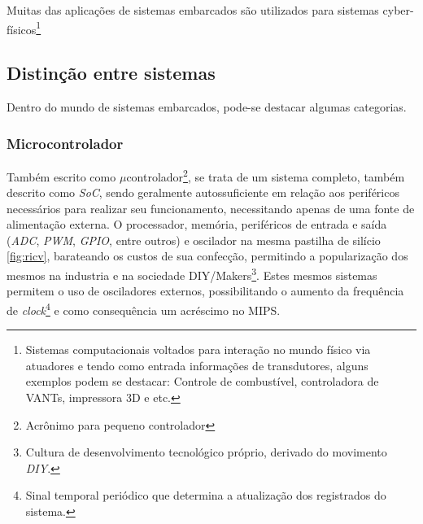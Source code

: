 Muitas das aplicações de sistemas embarcados são utilizados para sistemas cyber-físicos\footnote{Sistemas computacionais
voltados para interação no mundo físico via atuadores e tendo como entrada informações de transdutores, alguns exemplos
podem se destacar: Controle de combustível, controladora de VANTs, impressora 3D e etc.}

\subsection{Distinção entre sistemas}
Dentro do mundo de sistemas embarcados, pode-se destacar algumas categorias.

\subsubsection{Microcontrolador}

Também escrito como $\mu$controlador\footnote{Acrônimo para pequeno controlador}, se trata de um sistema completo,
também descrito como \textit{SoC}, sendo geralmente autossuficiente em relação aos periféricos necessários para
realizar seu funcionamento, necessitando apenas de uma fonte de alimentação externa. O processador, memória,
periféricos de entrada e saída (\textit{ADC}, \textit{PWM}, \textit{GPIO}, entre outros) e oscilador na mesma pastilha
de silício \ref{fig:ricv}, barateando os custos de sua confecção, permitindo a popularização dos mesmos na industria e na sociedade
DIY/Makers\footnote{Cultura de desenvolvimento tecnológico próprio, derivado do movimento \textit{DIY}.}. Estes mesmos
sistemas permitem o uso de osciladores externos, possibilitando o aumento da frequência de
\textit{clock}\footnote{Sinal temporal periódico que determina a atualização dos registrados do sistema.} e como
consequência um acréscimo no MIPS.



